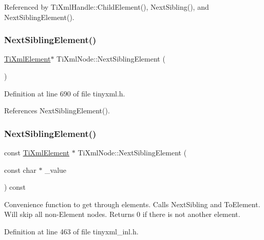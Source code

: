 Referenced by Ti\+Xml\+Handle\+::\+Child\+Element(), Next\+Sibling(), and Next\+Sibling\+Element().

\hypertarget{class_ti_xml_node_a1b211cb5034655a04358e0e2f6fc5010}{}\label{class_ti_xml_node_a1b211cb5034655a04358e0e2f6fc5010} 
\subsubsection{\texorpdfstring{Next\+Sibling\+Element()}{NextSiblingElement()}\hspace{0.1cm}{\footnotesize\ttfamily [2/6]}}
{\footnotesize\ttfamily \hyperlink{class_ti_xml_element}{Ti\+Xml\+Element}$\ast$ Ti\+Xml\+Node\+::\+Next\+Sibling\+Element (\begin{DoxyParamCaption}{ }\end{DoxyParamCaption})\hspace{0.3cm}{\ttfamily [inline]}}



Definition at line 690 of file tinyxml.\+h.



References Next\+Sibling\+Element().

\hypertarget{class_ti_xml_node_a22def4746238abaee042f99b47ef3c94}{}\label{class_ti_xml_node_a22def4746238abaee042f99b47ef3c94} 
\subsubsection{\texorpdfstring{Next\+Sibling\+Element()}{NextSiblingElement()}\hspace{0.1cm}{\footnotesize\ttfamily [3/6]}}
{\footnotesize\ttfamily const \hyperlink{class_ti_xml_element}{Ti\+Xml\+Element} $\ast$ Ti\+Xml\+Node\+::\+Next\+Sibling\+Element (\begin{DoxyParamCaption}\item[{const char $\ast$}]{\+\_\+value }\end{DoxyParamCaption}) const}

Convenience function to get through elements. Calls Next\+Sibling and To\+Element. Will skip all non-\/\+Element nodes. Returns 0 if there is not another element. 

Definition at line 463 of file tinyxml\+\_\+inl.\+h.



